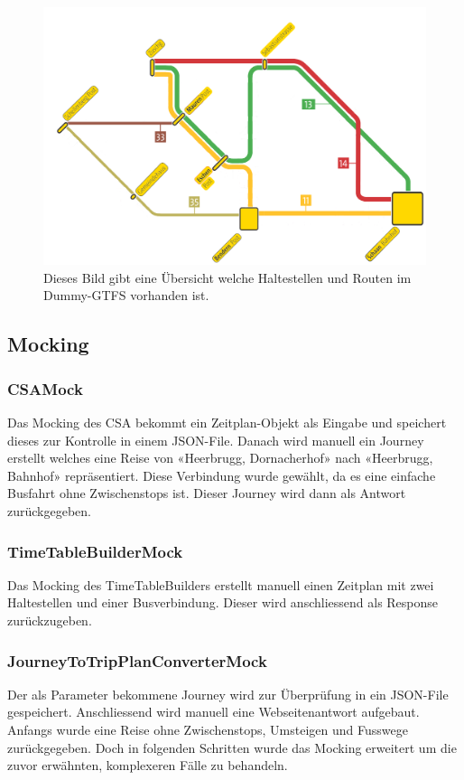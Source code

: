\begin{figure}[h]
	\centering
	\includegraphics[width=12cm]{img/LiniennetzDummyGTFS.png}
	\caption{Dieses Bild gibt eine Übersicht welche Haltestellen und Routen im Dummy-GTFS vorhanden ist.}
	\label{fig:DummyGTFS-uebersicht}
\end{figure}




\subsection{Mocking}


\subsubsection{CSAMock}
Das Mocking des CSA bekommt ein Zeitplan-Objekt als Eingabe und speichert dieses zur Kontrolle in einem JSON-File. Danach wird manuell ein Journey erstellt welches eine Reise von «Heerbrugg, Dornacherhof» nach «Heerbrugg, Bahnhof» repräsentiert. Diese Verbindung wurde gewählt, da es eine einfache Busfahrt ohne Zwischenstops ist. Dieser Journey wird dann als Antwort zurückgegeben.

\subsubsection{TimeTableBuilderMock}
Das Mocking des TimeTableBuilders erstellt manuell einen Zeitplan mit zwei Haltestellen und einer Busverbindung. Dieser wird anschliessend als Response zurückzugeben.

\subsubsection{JourneyToTripPlanConverterMock}
Der als Parameter bekommene Journey wird zur Überprüfung in ein JSON-File gespeichert. Anschliessend wird manuell eine Webseitenantwort aufgebaut. Anfangs wurde eine Reise ohne Zwischenstops, Umsteigen und Fusswege zurückgegeben. Doch in folgenden Schritten wurde das Mocking erweitert um die zuvor erwähnten, komplexeren Fälle zu behandeln.

